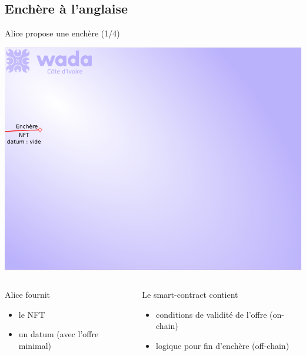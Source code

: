 \documentclass[presentation]{beamer}
\begin{document}
\subsection{Enchère à l'anglaise}
\label{sec:org392ca42}
\begin{frame}[label={sec:org40483a6}]{Alice propose une enchère (1/4)}
\begin{center}
\includegraphics[height=.5\textheight]{Images/enchere_01.png}
\end{center}
\begin{columns}
\begin{column}{0.3\columnwidth}
\begin{block}{Alice fournit}
\begin{itemize}
\item le NFT
\item un datum (avec l'offre minimal)
\end{itemize}
\end{block}
\end{column}
\begin{column}{0.7\columnwidth}
\begin{block}{Le smart-contract contient}
\begin{itemize}
\item conditions de validité de l'offre (on-chain)
\item logique pour fin d'enchère (off-chain)
\end{itemize}
\end{block}
\end{column}
\end{columns}
\end{frame}
\end{document}
